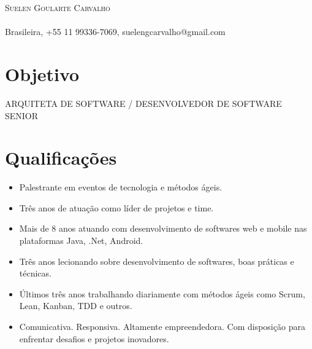 \documentclass[a4paper, oneside, final]{article}
\begin{document}
\begin{center}
\textsc{\Huge{Suelen Goularte Carvalho}}\\
\ \\
Brasileira, +55 11 99336-7069, suelengcarvalho@gmail.com


\section{Objetivo}
	ARQUITETA DE SOFTWARE / DESENVOLVEDOR DE SOFTWARE SENIOR



\section{Qualificações}

\begin{itemize}
	\item Palestrante em eventos de tecnologia e métodos ágeis.
	\item Três anos de atuação como líder de projetos e time.
	\item Mais de 8 anos atuando com desenvolvimento de softwares web e mobile nas plataformas Java, .Net, Android.
	\item Três anos lecionando sobre desenvolvimento de softwares, boas práticas e técnicas. 
	\item Últimos três anos trabalhando diariamente com métodos ágeis como Scrum, Lean, Kanban, TDD e outros. 
	\item Comunicativa. Responsiva. Altamente empreendedora. Com disposição para enfrentar desafios e projetos inovadores.\\
\end{itemize}


\end{center}
\end{document}
